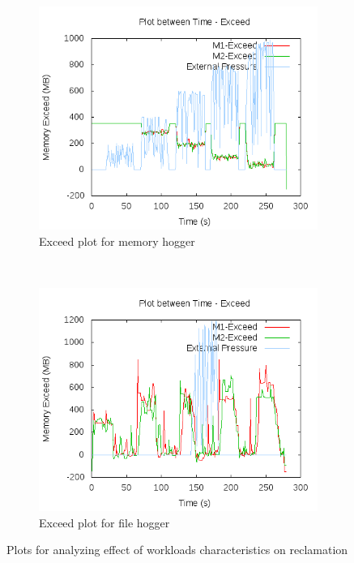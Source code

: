 	  \begin{figure}[t!]
	    \centering
	    \begin{subfigure}[t]{0.48\textwidth}
	      \centering
	      \includegraphics[width=1\textwidth]{images/controller_issues/workload/1/Exceed.png}
	      \caption{Exceed plot for memory hogger}
	      \label{img:workload_1_exceed}
	    \end{subfigure}
	    ~ 
	    \begin{subfigure}[t]{0.48\textwidth}
	      \centering
	      \includegraphics[width=1\textwidth]{images/controller_issues/workload/2/Exceed.png}
	      \caption{Exceed plot for file hogger}
	      \label{img:workload_2_exceed}
	    \end{subfigure}
	    \caption{Plots for analyzing effect of workloads characteristics on reclamation}
	  \end{figure}		
	    
